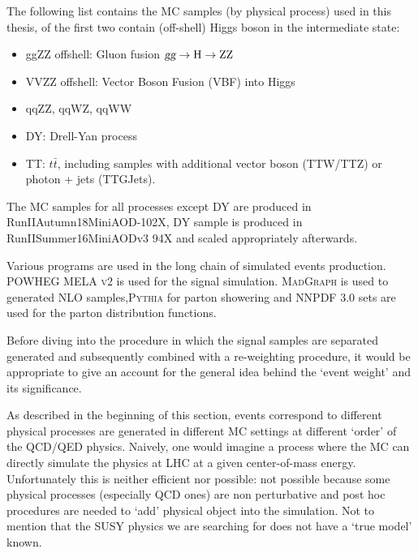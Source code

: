


The following list contains the MC samples (by physical process) used in this thesis, of the first two
contain (off-shell) Higgs boson in the intermediate state:
\begin{itemize}
\item ggZZ offshell: Gluon fusion $\textsl{g}\textsl{g} \rightarrow\mathrm{H}\rightarrow\mathrm{ZZ}$
\item VVZZ offshell: Vector Boson Fusion (VBF) into Higgs
\item qqZZ, qqWZ, qqWW
\item DY: Drell-Yan process
\item TT: $t\bar{t}$, including samples with additional vector boson (TTW/TTZ) or photon + jets (TTGJets).
\end{itemize}

The MC samples for all processes except DY are produced in RunIIAutumn18MiniAOD-102X,
DY sample is produced in RunIISummer16MiniAODv3 94X and scaled appropriately afterwards.

Various programs are used in the long chain of simulated events production.
\textsc{POWHEG MELA v2}\xspace\cite{POWHEG} is used for the signal simulation.
\textsc{MadGraph}\xspace is used to generated NLO samples,\textsc{Pythia}\xspace for parton
showering and \textsc{NNPDF} 3.0 sets are used for the parton distribution functions.

Before diving into the procedure in which the signal samples are separated generated and
subsequently combined with a re-weighting procedure, it would be appropriate to give
an account for the general idea behind the `event weight' and its significance.

As described in the beginning of this section, events correspond to different physical
processes are generated in different MC settings at different `order' of the QCD/QED physics.
Naively, one would imagine a process where the MC can directly simulate the physics at
LHC at a given center-of-mass energy. Unfortunately this is neither efficient nor possible:
not possible because some physical processes (especially QCD ones) are non perturbative and
post hoc procedures are needed to `add' physical object into the simulation. Not to mention
that the SUSY physics we are searching for does not have a `true model' known.

